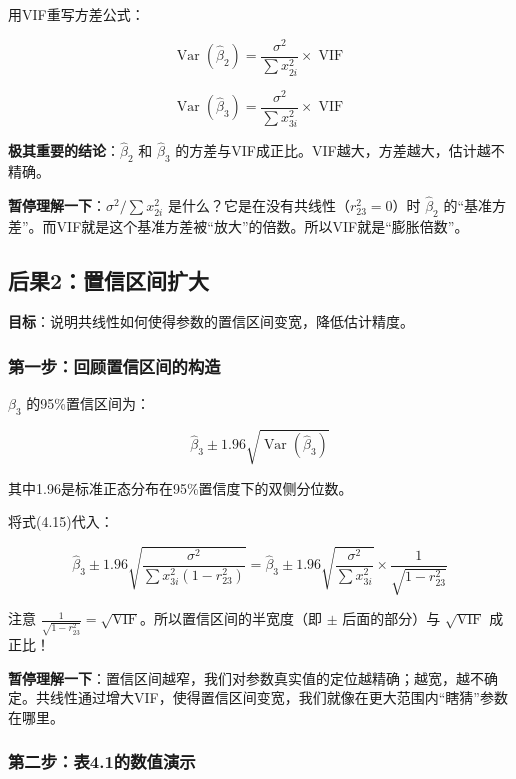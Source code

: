 \documentclass[12pt,a4paper]{ctexart}
\newcommand{\Var}{\operatorname{Var}}
\newcommand{\VIF}{\operatorname{VIF}}
\begin{document}
用VIF重写方差公式：

\begin{equation}
\Var(\hat{\beta}_2) = \frac{\sigma^2}{\sum x_{2i}^2} \times \VIF \tag{4.18}
\end{equation}

\begin{equation}
\Var(\hat{\beta}_3) = \frac{\sigma^2}{\sum x_{3i}^2} \times \VIF \tag{4.19}
\end{equation}

\textbf{极其重要的结论}：$\hat{\beta}_2$ 和 $\hat{\beta}_3$ 的方差与VIF成正比。VIF越大，方差越大，估计越不精确。

\textbf{暂停理解一下}：$\sigma^2/\sum x_{2i}^2$ 是什么？它是在没有共线性（$r_{23}^2=0$）时 $\hat{\beta}_2$ 的“基准方差”。而VIF就是这个基准方差被“放大”的倍数。所以VIF就是“膨胀倍数”。

\subsection{后果2：置信区间扩大}

\textbf{目标}：说明共线性如何使得参数的置信区间变宽，降低估计精度。

\subsubsection{第一步：回顾置信区间的构造}

$\beta_3$ 的95\%置信区间为：

\[
\hat{\beta}_3 \pm 1.96 \sqrt{\Var(\hat{\beta}_3)}
\]

其中1.96是标准正态分布在95\%置信度下的双侧分位数。

将式(4.15)代入：

\[
\hat{\beta}_3 \pm 1.96 \sqrt{\frac{\sigma^2}{\sum x_{3i}^2 (1 - r_{23}^2)}} = \hat{\beta}_3 \pm 1.96 \sqrt{\frac{\sigma^2}{\sum x_{3i}^2}} \times \frac{1}{\sqrt{1 - r_{23}^2}}
\]

注意 $\frac{1}{\sqrt{1-r_{23}^2}} = \sqrt{\VIF}$。所以置信区间的半宽度（即 $\pm$ 后面的部分）与 $\sqrt{\VIF}$ 成正比！

\textbf{暂停理解一下}：置信区间越窄，我们对参数真实值的定位越精确；越宽，越不确定。共线性通过增大VIF，使得置信区间变宽，我们就像在更大范围内“瞎猜”参数在哪里。

\subsubsection{第二步：表4.1的数值演示}
\end{document}
